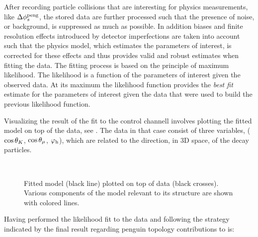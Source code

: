 After recording particle collisions that are interesting for physics measurements, like $\Delta\phi_{s}^{\tiny\text{peng}}$,
the stored data are further processed such that the presence of noise, or background, is suppressed as much
as possible. In addition biases and finite resolution effects introduced by detector imperfections are
taken into account such that the physics model, which estimates the parameters of interest, is
corrected for these effects and thus provides valid and robust estimates when fitting the data.
The fitting process is based on the principle of maximum likelihood. The likelihood is a
function of the parameters of interest given the observed data. At its maximum the likelihood function
provides the {\it best fit} estimate for the parameters of interest given the data that were
used to build the previous likelihood function.

Visualizing the result of the fit to the \BsJpsiKst control channell involves plotting the fitted model on top of the data,
see . The data in that case consist of three variables,
($\cos\theta_{K}$, $\cos\theta_{\mu}$, $\varphi_{\rm h}$), which are related to the direction, in 3D space,
of the \BsJpsiKst decay particles.

\begin{figure}[!t]
  \begin{subfigure}{0.5\textwidth}
    \centering
    \scalebox{1.2}{}
  \end{subfigure}%
  \hfill
  \begin{subfigure}{0.5\textwidth}
    \centering
    \scalebox{1.2}{}
  \end{subfigure}\\
  \begin{subfigure}{\textwidth}
    \centering
    \scalebox{1.2}{}
  \end{subfigure}
  \caption{Fitted model (black line) plotted on top of \BsJpsiKst data (black crosses).
           Various components of the model relevant to its \CP structure are shown with colored lines.}
  \label{app_angular_plot_thetas}
\end{figure}

Having performed the likelihood fit to the data and
following the strategy indicated by \cite{Fleischer:1999zi,Faller:2008gt,DeBruyn:2014oga,DeBruyn-thesis}
the final result regarding penguin topology contributions to \phis is:

